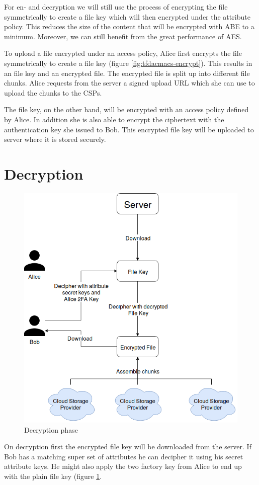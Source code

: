 For en- and decryption we will still use the process of encrypting the file symmetrically to create a file key which will then encrypted under the attribute policy. This reduces the size of the content that will be encrypted with ABE to a minimum. Moreover, we can still benefit from the great performance of \ac{AES}. 

To upload a file encrypted under an access policy, Alice first encrypts the file symmetrically to create a file key (figure \ref{fig:tfdacmacs-encrypt}). This results in an file key and an encrypted file. The encrypted file is split up into different file chunks. Alice requests from the server a signed upload URL which she can use to upload the chunks to the CSPs. 

The file key, on the other hand, will be encrypted with an access policy defined by Alice. In addition she is also able to encrypt the ciphertext with the authentication key she issued to Bob. This encrypted file key will be uploaded to server where it is stored securely. 

\section{Decryption}
\begin{figure}[!t]
\centering
    \includegraphics[width=0.7\linewidth]{img/TF-DAC-MACS-overview-decrypt.png}
    \caption{Decryption phase}
    \label{fig:tfdacmacs-decryption}
\end{figure}

On decryption first the encrypted file key will be downloaded from the server. If Bob has a matching super set of attributes he can decipher it using his secret attribute keys. He might also apply the two factory key from Alice to end up with the plain file key (figure \ref{fig:tfdacmacs-decryption}. 

